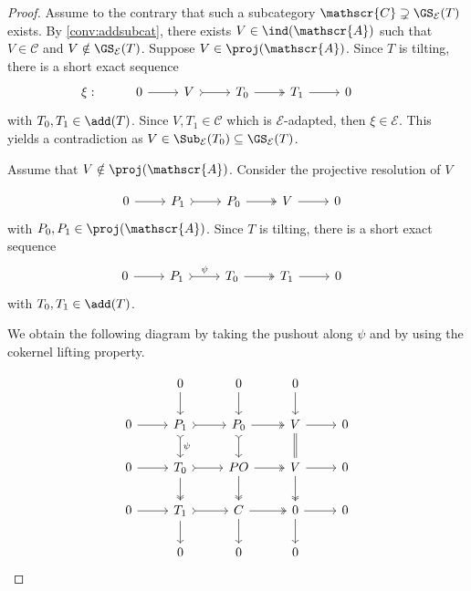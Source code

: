 \begin{proof}
Assume to the contrary that such a subcategory $\mathscr{C} \supsetneq \GS_{\mathcal{E}}(T)$ exists. By \cref{conv:addsubcat}, there exists $V \in \ind(\mathscr{A})$ such that $V \in \mathscr{C}$ and $V \notin \GS_{\mathcal{E}}(T)$.
Suppose $V \in \proj(\mathscr{A})$. Since $T$ is tilting, there is a short exact sequence 
\[\begin{tikzcd}
	\xi: & 0 & V & T_0 & T_1 &  0 & 
	\arrow[from=1-2, to=1-3]
	\arrow[tail, from=1-3, to=1-4]
	\arrow[two heads,from=1-4, to=1-5]
	\arrow[from=1-5, to=1-6]
\end{tikzcd}\] with $T_0,T_1 \in \add(T)$.
Since $V,T_1 \in \mathscr{C}$ which is $\mathcal{E}$-adapted, then $\xi \in \mathcal{E}$. This yields a contradiction as $V \in \Sub_\mathcal{E}(T_0) \subseteq \GS_\mathcal{E}(T)$.

\bigskip

Assume that $V \notin \proj(\mathscr{A})$. Consider the projective resolution of $V$

\[\begin{tikzcd}
     & 0 & P_1 & P_0 & V &  0 & 
	\arrow[from=1-2, to=1-3]
	\arrow[tail, from=1-3, to=1-4]
	\arrow[two heads,from=1-4, to=1-5]
	\arrow[from=1-5, to=1-6]
\end{tikzcd}\] with $P_0,P_1 \in \proj(\mathscr{A})$. Since $T$ is tilting, there is a short exact sequence 
\[\begin{tikzcd}
     & 0 & P_1 & T_0 & T_1 &  0 & 
	\arrow[from=1-2, to=1-3]
	\arrow[tail,"\psi", from=1-3, to=1-4]
	\arrow[two heads,from=1-4, to=1-5]
	\arrow[from=1-5, to=1-6]
\end{tikzcd}\] with $T_0,T_1 \in \add(T)$.

\bigskip

We obtain the following diagram by taking the pushout along $\psi$ and by using the cokernel lifting property.
  
\[\begin{tikzcd}
         & 0 & 0 & 0 &  \\
	0 & P_1 & P_0  & V &  0 \\
     0 & T_0 & PO & V & 0 \\
      0 & T_1 & C & 0 & 0 \\
       & 0 & 0 & 0 & 
	\arrow[from=2-1, to=2-2]
	\arrow[tail, from=2-2, to=2-3]
	\arrow[two heads,from=2-3, to=2-4]
	\arrow[from=2-4, to=2-5]
        \arrow[from=3-1, to=3-2]
	\arrow[tail, from=3-2, to=3-3]
	\arrow[two heads,from=3-3, to=3-4]
	\arrow[from=3-4, to=3-5]
        \arrow[from=4-1, to=4-2]
	\arrow[tail, from=4-2, to=4-3]
	\arrow[two heads,from=4-3, to=4-4]
	\arrow[from=4-4, to=4-5]
        \arrow[from=4-2, to=5-2]
	\arrow[two heads, from=3-2, to=4-2]
	\arrow[tail,"\psi",from=2-2, to=3-2]
	\arrow[from=1-2, to=2-2]
        \arrow[from=4-3, to=5-3]
	\arrow[two heads, from=3-3, to=4-3]
	\arrow[tail,from=2-3, to=3-3]
	\arrow[from=1-3, to=2-3]
        \arrow[from=4-4, to=5-4]
	\arrow[two heads, from=3-4, to=4-4]
	\arrow[equals,from=2-4, to=3-4]
	\arrow[from=1-4, to=2-4]
\end{tikzcd} \]


\end{proof}
